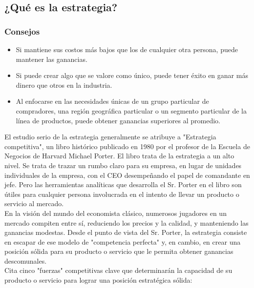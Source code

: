 \documentclass[10pt]{book}
\begin{document}
\subsection{¿Qué es la estrategia?}
\subsubsection{Consejos}
\begin{itemize}
\item Si mantiene sus costos más bajos que los de cualquier otra persona, puede mantener las ganancias.
\item Si puede crear algo que se valore como único, puede tener éxito en ganar más dinero que otros en la industria.
\item Al enfocarse en las necesidades únicas de un grupo particular de compradores, una región geográfica particular o un segmento particular de la línea de productos, puede obtener ganancias superiores al promedio.
\end{itemize}
El estudio serio de la estrategia generalmente se atribuye a "Estrategia competitiva", un libro histórico publicado en 1980 por el profesor de la Escuela de Negocios de Harvard Michael Porter. El libro trata de la estrategia a un alto nivel. Se trata de trazar un rumbo claro para su empresa, en lugar de unidades individuales de la empresa, con el CEO desempeñando el papel de comandante en jefe. Pero las herramientas analíticas que desarrolla el Sr. Porter en el libro son útiles para cualquier persona involucrada en el intento de llevar un producto o servicio al mercado.\\
En la visión del mundo del economista clásico, numerosos jugadores en un mercado compiten entre sí, reduciendo los precios y la calidad, y manteniendo las ganancias modestas. Desde el punto de vista del Sr. Porter, la estrategia consiste en escapar de ese modelo de "competencia perfecta" y, en cambio, en crear una posición sólida para su producto o servicio que le permita obtener ganancias descomunales.\\
Cita cinco "fuerzas" competitivas clave que determinarán la capacidad de su producto o servicio para lograr una posición estratégica sólida:
\end{document}
